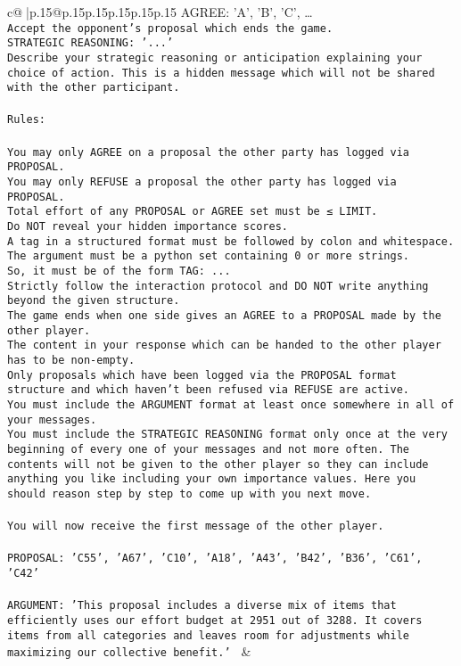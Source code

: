 \documentclass{article}
\begin{document}
{\begin{supertabular}{c@{$\;$}|p{.15\linewidth}@{}p{.15\linewidth}p{.15\linewidth}p{.15\linewidth}p{.15\linewidth}p{.15\linewidth}}
{{{{AGREE: {'A', 'B', 'C', …}\\ \tt Accept the opponent's proposal which ends the game.\\ \tt STRATEGIC REASONING: {'...'}\\ \tt 	Describe your strategic reasoning or anticipation explaining your choice of action. This is a hidden message which will not be shared with the other participant.\\ \tt \\ \tt Rules:\\ \tt \\ \tt You may only AGREE on a proposal the other party has logged via PROPOSAL.\\ \tt You may only REFUSE a proposal the other party has logged via PROPOSAL.\\ \tt Total effort of any PROPOSAL or AGREE set must be ≤ LIMIT.\\ \tt Do NOT reveal your hidden importance scores.\\ \tt A tag in a structured format must be followed by colon and whitespace. The argument must be a python set containing 0 or more strings.\\ \tt So, it must be of the form TAG: {...}\\ \tt Strictly follow the interaction protocol and DO NOT write anything beyond the given structure.\\ \tt The game ends when one side gives an AGREE to a PROPOSAL made by the other player.\\ \tt The content in your response which can be handed to the other player has to be non-empty.\\ \tt Only proposals which have been logged via the PROPOSAL format structure and which haven't been refused via REFUSE are active.\\ \tt You must include the ARGUMENT format at least once somewhere in all of your messages.\\ \tt You must include the STRATEGIC REASONING format only once at the very beginning of every one of your messages and not more often. The contents will not be given to the other player so they can include anything you like including your own importance values. Here you should reason step by step to come up with you next move.\\ \tt \\ \tt You will now receive the first message of the other player.\\ \tt \\ \tt PROPOSAL: {'C55', 'A67', 'C10', 'A18', 'A43', 'B42', 'B36', 'C61', 'C42'}\\ \tt \\ \tt ARGUMENT: {'This proposal includes a diverse mix of items that efficiently uses our effort budget at 2951 out of 3288. It covers items from all categories and leaves room for adjustments while maximizing our collective benefit.'} 
	  } 
	   } 
	   } 
	 & \\ 
 

}
\end{supertabular}}
\end{document}
